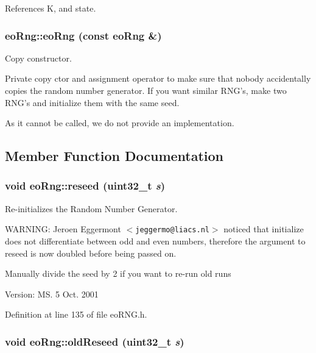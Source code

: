 References K, and state.
\subsubsection{\setlength{\rightskip}{0pt plus 5cm}eo\-Rng::eo\-Rng (const {\bf eo\-Rng} \&)\hspace{0.3cm}{\tt  [private]}}\label{classeo_rng_d2}


Copy constructor. 

Private copy ctor and assignment operator to make sure that nobody accidentally copies the random number generator. If you want similar RNG's, make two RNG's and initialize them with the same seed.

As it cannot be called, we do not provide an implementation. 

\subsection{Member Function Documentation}
\subsubsection{\setlength{\rightskip}{0pt plus 5cm}void eo\-Rng::reseed (uint32\_\-t {\em s})\hspace{0.3cm}{\tt  [inline]}}\label{classeo_rng_a2}


Re-initializes the Random Number Generator. 

WARNING: Jeroen Eggermont $<${\tt jeggermo@liacs.nl}$>$ noticed that initialize does not differentiate between odd and even numbers, therefore the argument to reseed is now doubled before being passed on.

Manually divide the seed by 2 if you want to re-run old runs

\begin{Desc}
\item[Version:]MS. 5 Oct. 2001 \end{Desc}


Definition at line 135 of file eo\-RNG.h.
\subsubsection{\setlength{\rightskip}{0pt plus 5cm}void eo\-Rng::old\-Reseed (uint32\_\-t {\em s})\hspace{0.3cm}{\tt  [inline]}}\label{classeo_rng_a3}


